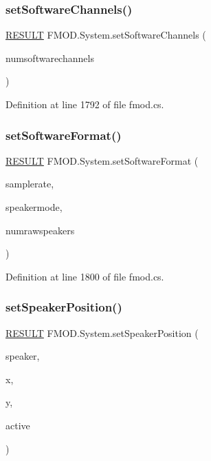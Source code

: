 \subsubsection{\texorpdfstring{set\+Software\+Channels()}{setSoftwareChannels()}}
{\footnotesize\ttfamily \hyperlink{namespace_f_m_o_d_a305d1176ef3f8c8815861a60407ac33d}{R\+E\+S\+U\+LT} F\+M\+O\+D.\+System.\+set\+Software\+Channels (\begin{DoxyParamCaption}\item[{int}]{numsoftwarechannels }\end{DoxyParamCaption})}



Definition at line 1792 of file fmod.\+cs.

\mbox{\label{class_f_m_o_d_1_1_system_a53f963856ac3683ca81bdfb460fe1b19}} 
\subsubsection{\texorpdfstring{set\+Software\+Format()}{setSoftwareFormat()}}
{\footnotesize\ttfamily \hyperlink{namespace_f_m_o_d_a305d1176ef3f8c8815861a60407ac33d}{R\+E\+S\+U\+LT} F\+M\+O\+D.\+System.\+set\+Software\+Format (\begin{DoxyParamCaption}\item[{int}]{samplerate,  }\item[{\hyperlink{namespace_f_m_o_d_aa0732e7e8efd3b96b526a7f2f8479634}{S\+P\+E\+A\+K\+E\+R\+M\+O\+DE}}]{speakermode,  }\item[{int}]{numrawspeakers }\end{DoxyParamCaption})}



Definition at line 1800 of file fmod.\+cs.

\mbox{\label{class_f_m_o_d_1_1_system_a09af3ab8333e4f0d87001958b38d4262}} 
\subsubsection{\texorpdfstring{set\+Speaker\+Position()}{setSpeakerPosition()}}
{\footnotesize\ttfamily \hyperlink{namespace_f_m_o_d_a305d1176ef3f8c8815861a60407ac33d}{R\+E\+S\+U\+LT} F\+M\+O\+D.\+System.\+set\+Speaker\+Position (\begin{DoxyParamCaption}\item[{\hyperlink{namespace_f_m_o_d_a5ccb2623e74daa810e486429d60e4f48}{S\+P\+E\+A\+K\+ER}}]{speaker,  }\item[{float}]{x,  }\item[{float}]{y,  }\item[{bool}]{active }\end{DoxyParamCaption})}




